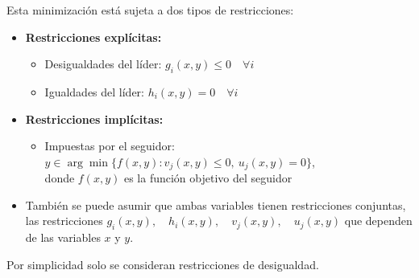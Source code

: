 
\newpage


Esta minimización está sujeta a dos tipos de restricciones: 
\begin{itemize}
    \item \textbf{Restricciones explícitas:}
    \begin{itemize}
        \item Desigualdades del líder: \( g_i(x,y) \leq 0 \quad \forall i \)
        \item Igualdades del líder: \( h_i(x,y) = 0 \quad \forall i \)
    \end{itemize}
    
    \item \textbf{Restricciones implícitas:}
    \begin{itemize}
        \item Impuestas por el seguidor: \( y \in \arg\min\{f(x, y) : v_j(x,y) \leq 0,\ u_j(x,y) = 0\} \),\\
        donde \( f(x, y) \) es la función objetivo del seguidor
    \end{itemize}
    
	 
	\item También se puede asumir que ambas variables tienen restricciones conjuntas, las restricciones $ g_i(x,y), \quad h_i(x,y), \quad v_j(x,y), \quad u_j(x,y) $ que dependen de las variables $x$ y $y$.
	
	
\end{itemize}
Por simplicidad solo se consideran restricciones de desigualdad.


